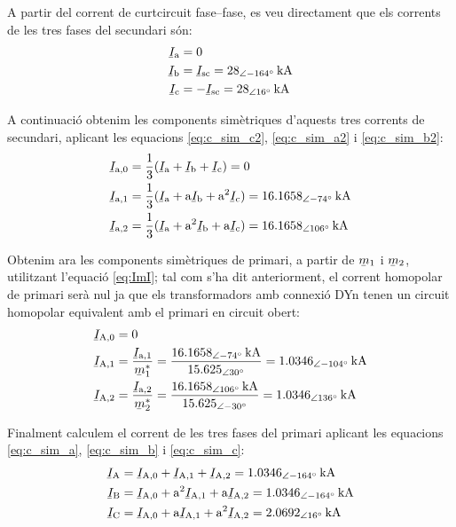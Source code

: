 \begin{exemple}
    \begin{center}
       
    \end{center}

    A partir del corrent de curtcircuit fase--fase, es veu directament que els corrents de les tres fases del secundari són:
    \begin{align*}
        \cmplx{I}\ped{a} &= 0  \\
        \cmplx{I}\ped{b} &= \cmplx{I}\ped{sc} = \SIpd{28}{-164}{kA}  \\
        \cmplx{I}\ped{c} &= -\cmplx{I}\ped{sc} = \SIpd{28}{16}{kA}
    \end{align*}

    A continuació obtenim les components simètriques d'aquests tres corrents de secundari, aplicant les equacions \eqref{eq:c_sim_c2}, \eqref{eq:c_sim_a2} i \eqref{eq:c_sim_b2}:
    \begin{align*}
        \cmplx{I}\ped{a,0} &= \frac{1}{3} (\cmplx{I}\ped{a} + \cmplx{I}\ped{b} +
        \cmplx{I}\ped{c}) = 0 \\
        \cmplx{I}\ped{a,1} &= \frac{1}{3} (\cmplx{I}\ped{a} + \au \cmplx{I}\ped{b} +
         \au^2 \cmplx{I}\ped{c}) = \SIpd{16,1658}{-74}{kA}  \\
        \cmplx{I}\ped{a,2} &= \frac{1}{3} (\cmplx{I}\ped{a} + \au^2 \cmplx{I}\ped{b} +
         \au \cmplx{I}\ped{c}) = \SIpd{16,1658}{106}{kA}
    \end{align*}

    Obtenim ara les components simètriques de primari, a partir de $\cmplx{m}_1$ i $\cmplx{m}_2$, utilitzant l'equació \eqref{eq:ImI}; tal com s'ha dit anteriorment, el corrent homopolar de primari serà nul ja que els transformadors amb connexió DYn tenen un circuit homopolar equivalent amb el primari en circuit obert:
    \begin{align*}
        \cmplx{I}\ped{A,0} &= 0 \\
        \cmplx{I}\ped{A,1} &= \frac{\cmplx{I}\ped{a,1}}{\cmplx{m}^*_1} = \frac{\SIpd{16,1658}{-74}{kA}}{\numpd{15,625}{30}} =  \SIpd{1,0346}{-104}{kA} \\
        \cmplx{I}\ped{A,2} &= \frac{\cmplx{I}\ped{a,2}}{\cmplx{m}^*_2} = \frac{\SIpd{16,1658}{106}{kA}}{\numpd{15,625}{-30}} = \SIpd{1,0346}{136}{kA}
    \end{align*}

    Finalment calculem el corrent de les tres fases del primari aplicant les equacions \eqref{eq:c_sim_a}, \eqref{eq:c_sim_b} i \eqref{eq:c_sim_c}:
     \begin{align*}
        \cmplx{I}\ped{A} &= \cmplx{I}\ped{A,0} + \cmplx{I}\ped{A,1} + \cmplx{I}\ped{A,2} = \SIpd{1,0346}{-164}{kA} \\
        \cmplx{I}\ped{B} &= \cmplx{I}\ped{A,0} + \au^2 \cmplx{I}\ped{A,1} + \au \cmplx{I}\ped{A,2} = \SIpd{1,0346}{-164}{kA} \\
        \cmplx{I}\ped{C} &= \cmplx{I}\ped{A,0} + \au \cmplx{I}\ped{A,1} + \au^2 \cmplx{I}\ped{A,2} = \SIpd{2,0692}{16}{kA}
    \end{align*}


\end{exemple}

